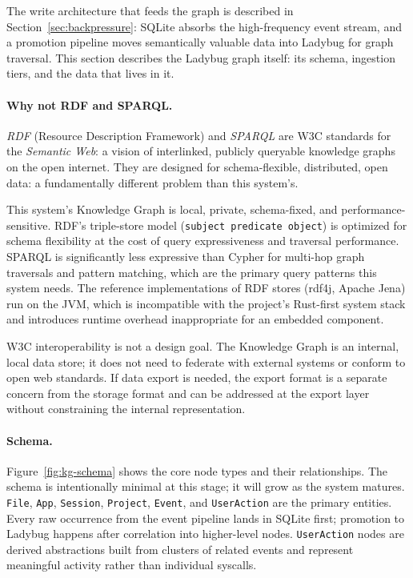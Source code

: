 The write architecture that feeds the graph is described in
Section~\ref{sec:backpressure}: SQLite absorbs the high-frequency event
stream, and a promotion pipeline moves semantically valuable data into Ladybug
for graph traversal. This section describes the Ladybug graph itself: its schema,
ingestion tiers, and the data that lives in it.

\paragraph{Why not RDF and SPARQL.}
\emph{RDF} (Resource Description Framework) and \emph{SPARQL} are W3C
standards for the \emph{Semantic Web}: a vision of interlinked, publicly
queryable knowledge graphs on the open internet. They are designed for
schema-flexible, distributed, open data: a fundamentally different problem
than this system's.

This system's Knowledge Graph is local, private, schema-fixed, and
performance-sensitive. RDF's triple-store model (\texttt{subject predicate
object}) is optimized for schema flexibility at the cost of query expressiveness
and traversal performance. SPARQL is significantly less expressive than Cypher
for multi-hop graph traversals and pattern matching, which are the primary
query patterns this system needs. The reference implementations of RDF stores
(rdf4j, Apache Jena) run on the JVM, which is incompatible with the project's
Rust-first system stack and introduces runtime overhead inappropriate for an
embedded component.

W3C interoperability is not a design goal. The Knowledge Graph is an internal,
local data store; it does not need to federate with external systems or conform
to open web standards. If data export is needed, the export format is a
separate concern from the storage format and can be addressed at the export
layer without constraining the internal representation.

\paragraph{Schema.}
Figure~\ref{fig:kg-schema} shows the core node types and their relationships.
The schema is intentionally minimal at this stage; it will grow as the system
matures. \texttt{File}, \texttt{App}, \texttt{Session}, \texttt{Project},
\texttt{Event}, and \texttt{UserAction} are the primary entities. Every raw
occurrence from the event pipeline lands in SQLite first; promotion to Ladybug
happens after correlation into higher-level nodes. \texttt{UserAction} nodes
are derived abstractions built from clusters of related events and represent
meaningful activity rather than individual syscalls.

